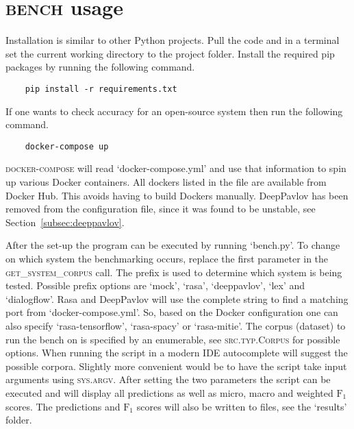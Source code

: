 \chapter{\textsc{bench} usage}
\label{ch:usage}
Installation is similar to other Python projects.
Pull the code and in a terminal set the current working directory to the project folder.
Install the required pip packages by running the following command.
\begin{verbatim}
    pip install -r requirements.txt
\end{verbatim}
If one wants to check accuracy for an open-source system then run the following command.
\begin{verbatim}
    docker-compose up
\end{verbatim}
\textsc{docker-compose} will read `docker-compose.yml' and use that information to spin up various Docker containers.
All dockers listed in the file are available from Docker Hub.
This avoids having to build Dockers manually.
DeepPavlov has been removed from the configuration file, since it was found to be unstable, see Section~\ref{subsec:deeppavlov}.

After the set-up the program can be executed by running `bench.py'.
To change on which system the benchmarking occurs, replace the first parameter in the \textsc{get\_system\_corpus} call.
The prefix is used to determine which system is being tested.
Possible prefix options are `mock', `rasa', `deeppavlov', `lex' and `dialogflow'.
Rasa and DeepPavlov will use the complete string to find a matching port from `docker-compose.yml'.
So, based on the Docker configuration one can also specify `rasa-tensorflow', `rasa-spacy' or `rasa-mitie'.
The corpus (dataset) to run the bench on is specified by an enumerable, see \textsc{src.typ.Corpus} for possible options.
When running the script in a modern IDE autocomplete will suggest the possible corpora.
Slightly more convenient would be to have the script take input arguments using \textsc{sys.argv}.
After setting the two parameters the script can be executed and will display all predictions as well as micro, macro and weighted $\text{F}_1$ scores.
The predictions and $\text{F}_1$ scores will also be written to files, see the `results' folder.
